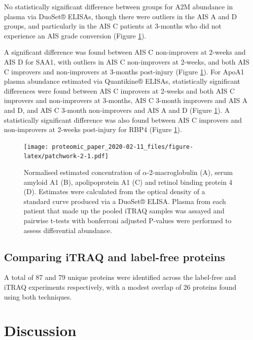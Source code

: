 \documentclass[
]{article}
\begin{document}
\begin{landscape}
\begin{landscape}
No statistically significant difference between groups for A2M abundance in plasma via DuoSet® ELISAs, though there were outliers in the AIS A and D groups, and particularly in the AIS C patients at 3-months who did not experience an AIS grade conversion (Figure \ref{fig:patchwork-2}).

A significant difference was found between AIS C non-improvers at 2-weeks and AIS D for SAA1, with outliers in AIS C non-improvers at 2-weeks, and both AIS C improvers and non-improvers at 3-months post-injury (Figure \ref{fig:patchwork-2}).
For ApoA1 plasma abundance estimated via Quantikine® ELISAs, statistically significant differences were found between AIS C improvers at 2-weeks and both AIS C improvers and non-improvers at 3-months, AIS C 3-month improvers and AIS A and D, and AIS C 3-month non-improvers and AIS A and D (Figure \ref{fig:patchwork-2}).
A statistically significant difference was also found between AIS C improvers and non-improvers at 2-weeks post-injury for RBP4 (Figure \ref{fig:patchwork-2}).



\begin{figure}
\centering
\texttt{[image: proteomic\_paper\_2020-02-11\_files/figure-latex/patchwork-2-1.pdf]}
\caption{\label{fig:patchwork-2}Normalised estimated concentration of \(\alpha\)-2-macroglobulin (A), serum amyloid A1 (B), apolipoprotein A1 (C) and retinol binding protein 4 (D). Estimates were calculated from the optical density of a standard curve produced via a DuoSet® ELISA. Plasma from each patient that made up the pooled iTRAQ samples was assayed and pairwise t-tests with bonferroni adjusted P-values were performed to assess differential abundance.}
\end{figure}

\hypertarget{comparing-itraq-and-label-free-proteins}{%
\subsection{Comparing iTRAQ and label-free proteins}\label{comparing-itraq-and-label-free-proteins}}

A total of 87 and 79 unique proteins were identified across the label-free and iTRAQ experiments respectively, with a modest overlap of 26 proteins found using both techniques.



\hypertarget{discussion}{%
\section{Discussion}\label{discussion}}


\end{landscape}
\end{landscape}
\end{document}
